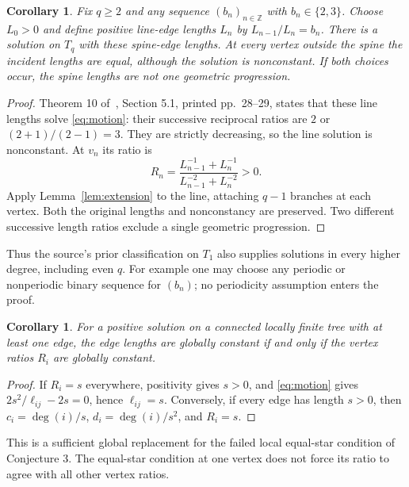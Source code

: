 \documentclass[11pt]{article}
\newtheorem{corollary}[theorem]{Corollary}
\begin{document}
\begin{corollary}\label{cor:patterns}
Fix $q\geq2$ and any sequence $(b_n)_{n\in\mathbb Z}$ with
$b_n\in\{2,3\}$. Choose $L_0>0$ and define positive line-edge lengths
$L_n$ by $L_{n-1}/L_n=b_n$. There is a solution on $T_q$ with these
spine-edge lengths. At every vertex outside the spine the incident
lengths are equal, although the solution is nonconstant. If both choices
occur, the spine lengths are not one geometric progression.
\end{corollary}
\begin{proof}
Theorem 10 of~\cite{HSXZ}, Section 5.1, printed pp.~28--29, states that
these line lengths solve \eqref{eq:motion}: their successive reciprocal
ratios are $2$ or $(2+1)/(2-1)=3$. They are strictly decreasing, so the
line solution is nonconstant. At $v_n$ its ratio is
\[
 R_n=\frac{L_{n-1}^{-1}+L_n^{-1}}{L_{n-1}^{-2}+L_n^{-2}}>0.
\]
Apply Lemma~\ref{lem:extension} to the line, attaching $q-1$ branches
at each vertex. Both the original lengths and nonconstancy are preserved.
Two different successive length ratios exclude a single geometric
progression.
\end{proof}

Thus the source's prior classification on $T_1$ also supplies solutions
in every higher degree, including even $q$. For example one may choose
any periodic or nonperiodic binary sequence for $(b_n)$; no periodicity
assumption enters the proof.

\begin{corollary}\label{cor:global}
For a positive solution on a connected locally finite tree with at least
one edge, the edge lengths are globally constant if and only if the
vertex ratios $R_i$ are globally constant.
\end{corollary}
\begin{proof}
If $R_i=s$ everywhere, positivity gives $s>0$, and
\eqref{eq:motion} gives $2s^2/\ell_{ij}-2s=0$, hence $\ell_{ij}=s$.
Conversely, if every edge has length $s>0$, then
$c_i=\deg(i)/s$, $d_i=\deg(i)/s^2$, and $R_i=s$.
\end{proof}
This is a sufficient global replacement for the failed local equal-star
condition of Conjecture 3. The equal-star condition at one vertex does
not force its ratio to agree with all other vertex ratios.
\end{document}
